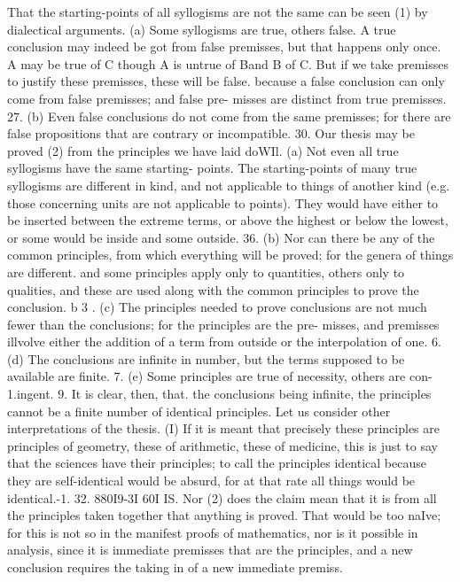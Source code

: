That the starting-points of all syllogisms are not the
same can be seen (1) by dialectical arguments.
(a) Some syllogisms are true, others false.
A true conclusion may indeed be got from false premisses,
but that happens only once.
 A may be true of
C though A is untrue of Band B of C. But if we take premisses
to justify these premisses, these will be false. because a false
conclusion can only come from false premisses; and false pre-
misses are distinct from true premisses.
27. (b) Even false conclusions do not come from the same
premisses; for there are false propositions that are contrary or
incompatible.
30. Our thesis may be proved (2) from the principles we have
laid doWIl. (a) Not even all true syllogisms have the same starting-
points. The starting-points of many true syllogisms are different
in kind, and not applicable to things of another kind (e.g. those
concerning units are not applicable to points). They would have
either to be inserted between the extreme terms, or above the
highest or below the lowest, or some would be inside and some
outside.
36. (b) Nor can there be any of the common principles, from
which everything will be proved; for the genera of things are
different. and some principles apply only to quantities, others
only to qualities, and these are used along with the common
principles to prove the conclusion.
b 3 . (c) The principles needed to prove conclusions are not
much fewer than the conclusions; for the principles are the pre-
misses, and premisses illvolve either the addition of a term from
outside or the interpolation of one.
6. (d) The conclusions are infinite in number, but the terms
supposed to be available are finite.
7. (e) Some principles are true of necessity, others are con-
1.ingent.
9. It is clear, then, that. the conclusions being infinite, the
principles cannot be a finite number of identical principles. Let
us consider other interpretations of the thesis. (I) If it is meant
that precisely these principles are principles of geometry, these
of arithmetic, these of medicine, this is just to say that the sciences
have their principles; to call the principles identical because
they are self-identical would be absurd, for at that rate all things
would be identical.-1. 32. 880I9-3I
60I
IS. Nor (2) does the claim mean that it is from all the principles
taken together that anything is proved. That would be too naIve;
for this is not so in the manifest proofs of mathematics, nor is it
possible in analysis, since it is immediate premisses that are the
principles, and a new conclusion requires the taking in of a new
immediate premiss.
